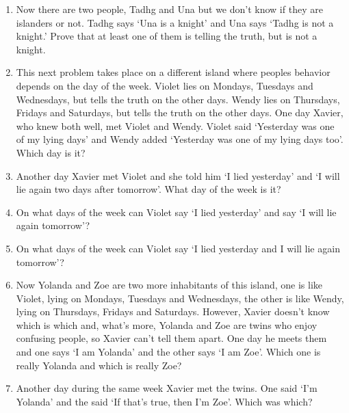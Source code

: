 \documentclass[12pt]{article}
\begin{document}
\begin{enumerate}
\item Now there are two people, Tadhg and Una but we don't know if
  they are islanders or not. Tadhg says \lq{}Una is a knight\rq{} and
  Una says \lq{}Tadhg is not a knight.\rq{} Prove that at least one of
  them is telling the truth, but is not a knight.

\item This next problem takes place on a different island where peoples behavior depends on the day of the week. Violet lies on Mondays, Tuesdays and Wednesdays, but tells the truth on the other days. Wendy lies on Thursdays, Fridays and Saturdays, but tells the truth on the other days. One day Xavier, who knew both well, met Violet and Wendy. Violet said \lq{}Yesterday was one of my lying days\rq{} and Wendy added \lq{}Yesterday was one of my lying days too\rq{}.  Which day is it?

\item Another day Xavier met Violet and she told him \lq{}I lied yesterday\rq{} and \lq{}I will lie again two days after tomorrow\rq{}. What day of the week is it?

\item On what days of the week can Violet say \lq{}I lied yesterday\rq{} and say \lq{}I will lie again tomorrow\rq{}?

\item On what days of the week can Violet say \lq{}I lied yesterday and I will lie again tomorrow\rq{}?

\item Now Yolanda and Zoe are two more inhabitants of this island, one is like Violet, lying on Mondays, Tuesdays and Wednesdays, the other is like Wendy, lying on Thursdays, Fridays and Saturdays. However, Xavier doesn't know which is which and, what's more, Yolanda and Zoe are twins who enjoy confusing people, so Xavier can't tell them apart. One day he meets them and one says \lq{}I am Yolanda\rq{} and the other says \lq{}I am Zoe\rq{}. Which one is really Yolanda and which is really Zoe?

\item Another day during the same week Xavier met the twins. One said
  \lq{}I'm Yolanda\rq{} and the said \lq{}If that's true, then I'm
  Zoe\rq{}. Which was which?

\end{enumerate}
\end{document}
